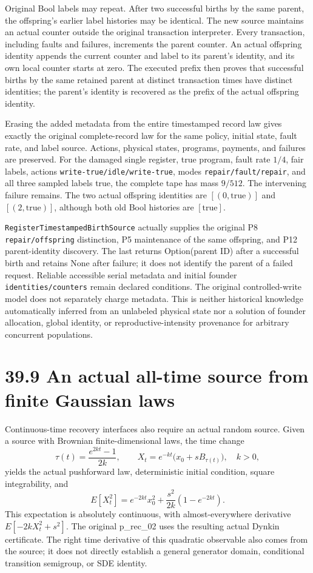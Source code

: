 \documentclass[
  english,
  11pt,
  oneside]{book}
\begin{document}
Original Bool labels may repeat. After two successful births by the same parent, the offspring's earlier label histories may be identical. The new source maintains an actual counter outside the original transaction interpreter. Every transaction, including faults and failures, increments the parent counter. An actual offspring identity appends the current counter and label to its parent's identity, and its own local counter starts at zero. The executed prefix then proves that successful births by the same retained parent at distinct transaction times have distinct identities; the parent's identity is recovered as the prefix of the actual offspring identity.

Erasing the added metadata from the entire timestamped record law gives exactly the original complete-record law for the same policy, initial state, fault rate, and label source. Actions, physical states, programs, payments, and failures are preserved. For the damaged single register, true program, fault rate \(1/4\), fair labels, actions \nolinkurl{write-true/idle/write-true}, modes \nolinkurl{repair/fault/repair}, and all three sampled labels true, the complete tape has mass \(9/512\). The intervening failure remains. The two actual offspring identities are \([(0,\mathrm{true})]\) and \([(2,\mathrm{true})]\), although both old Bool histories are \([\mathrm{true}]\).

\nolinkurl{RegisterTimestampedBirthSource} actually supplies the original P8 \nolinkurl{repair/offspring} distinction, P5 maintenance of the same offspring, and P12 parent-identity discovery. The last returns Option(parent ID) after a successful birth and retains None after failure; it does not identify the parent of a failed request. Reliable accessible serial metadata and initial founder \nolinkurl{identities/counters} remain declared conditions. The original controlled-write model does not separately charge metadata. This is neither historical knowledge automatically inferred from an unlabeled physical state nor a solution of founder allocation, global identity, or reproductive-intensity provenance for arbitrary concurrent populations.

\section{39.9 An actual all-time source from finite Gaussian laws}\label{an-actual-all-time-source-from-finite-gaussian-laws}

Continuous-time recovery interfaces also require an actual random source. Given a source with Brownian finite-dimensional laws, the time change \[\tau(t)=\frac{e^{2kt}-1}{2k},\qquad
X_t=e^{-kt}\bigl(x_0+sB_{\tau(t)}\bigr),\quad k>0,\] yields the actual pushforward law, deterministic initial condition, square integrability, and \[E[X_t^2]=e^{-2kt}x_0^2+\frac{s^2}{2k}(1-e^{-2kt}).\] This expectation is absolutely continuous, with almost-everywhere derivative \(E[-2kX_t^2+s^2]\). The original p\_rec\_02 uses the resulting actual Dynkin certificate. The right time derivative of this quadratic observable also comes from the source; it does not directly establish a general generator domain, conditional transition semigroup, or SDE identity.
\end{document}
